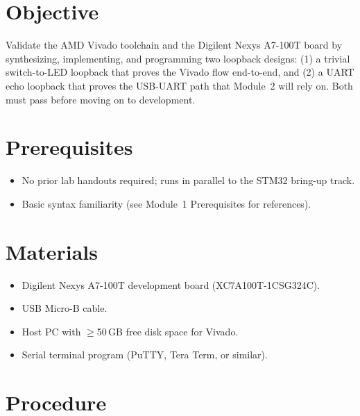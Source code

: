\documentclass[11pt,letterpaper]{article}
\begin{document}

\section{Objective}
Validate the AMD Vivado toolchain and the Digilent Nexys A7-100T board by synthesizing, implementing, and programming two loopback designs: (1) a trivial switch-to-\mbox{LED} loopback that proves the Vivado flow end-to-end, and (2) a \mbox{UART} echo loopback that proves the USB-\mbox{UART} path that Module~2 will rely on. Both must pass before moving on to \RTL{} development.

\section{Prerequisites}
\begin{itemize}[leftmargin=2em]
	\item No prior lab handouts required; runs in parallel to the STM32 bring-up track.
	\item Basic \VHDL{} syntax familiarity (see Module~1 Prerequisites for references).
\end{itemize}

\section{Materials}
\begin{itemize}[leftmargin=2em]
	\item Digilent Nexys A7-100T development board (XC7A100T-1CSG324C).
	\item USB Micro-B cable.
	\item Host PC with $\geq$50\,GB free disk space for Vivado.
	\item Serial terminal program (PuTTY, Tera Term, or similar).
\end{itemize}

\newpage
\section{Procedure}
\end{document}
